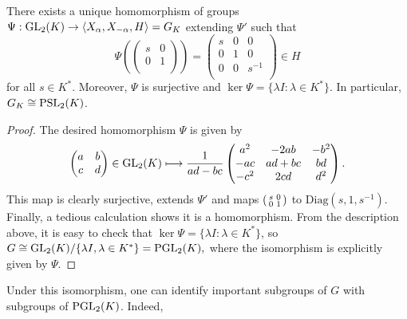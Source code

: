\begin{theorem}\label{thm:globalsl2}
    There exists a unique homomorphism of groups $\Psi:\mathrm{GL}_2(K)\to\langle X_\alpha,X_{-\alpha},H\rangle=G_K$
    extending $\Psi'$ such that 
    $$\Psi\left(\begin{pmatrix}
        s & 0\\
        0 & 1\\
    \end{pmatrix}\right)=\begin{pmatrix}
        s & 0 & 0\\
        0 & 1 & 0\\
        0 & 0 & s^{-1}\\
    \end{pmatrix}\in H$$
    for all $s\in K^*$. Moreover, $\Psi$ is surjective and $\ker\Psi=\{\lambda I:\lambda\in K^*\}$. In particular, $G_K\cong\mathrm{PSL}_2(K)$.
\end{theorem}
\begin{proof}
    The desired homomorphism $\Psi$ is given by
    $$\begin{pmatrix}
        a & b\\
        c & d\\
    \end{pmatrix}\in\mathrm{GL}_2(K)\longmapsto\frac{1}{ad-bc}\begin{pmatrix}
        a^2 & -2ab & -b^2\\
        -ac & ad+bc & bd\\
        -c^2 & 2cd & d^2\\
    \end{pmatrix}.$$ 
    This map is clearly surjective, extends $\Psi'$ and maps $\begin{psmallmatrix}
        s & 0\\
        0 & 1\\
    \end{psmallmatrix}$
    to $\mathrm{Diag}(s,1,s^{-1})$. Finally, a tedious calculation shows it is a homomorphism. From the description above, it is easy to check that $\ker\Psi=\{\lambda I:\lambda\in K^*\}$, so $G\cong\mathrm{GL}_2(K)/\{\lambda I,\lambda\in K^*\}=\mathrm{PGL}_2(K),$
    where the isomorphism is explicitly given by $\Psi$.
\end{proof}

Under this isomorphism, one can identify important subgroups of $G$ with subgroups of $\mathrm{PGL}_2(K)$. Indeed,

